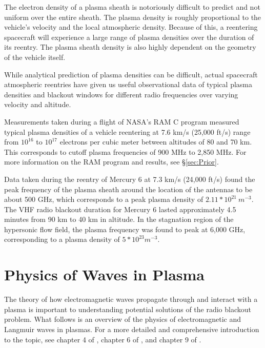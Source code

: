 \documentclass[twocolumn]{article}
\begin{document}
The electron density of a plasma sheath is notoriously difficult to predict and not uniform over the entire sheath.
The plasma density is roughly proportional to the vehicle's velocity and the local atmospheric density.
Because of this, a reentering spacecraft will experience a large range of plasma densities over the duration of its reentry.
The plasma sheath density is also highly dependent on the geometry of the vehicle itself.


While analytical prediction of plasma densities can be difficult, actual spacecraft atmospheric reentries have given us useful observational data of typical plasma densities and blackout windows for different radio frequencies over varying velocity and altitude.

Measurements taken during a flight of NASA's RAM C program measured typical plasma densities of a vehicle reentering at 7.6 km/s (25,000 ft/s) range from $10^{16}$ to $10^{17}$ electrons per cubic meter between altitudes of 80 and 70 km.\cite{akey_radio_1970}
This corresponds to cutoff plasma frequencies of 900 MHz to 2,850 MHz.
For more information on the RAM program and results, see \S\ref{sec:Prior}.

Data taken during the reentry of Mercury 6 at 7.3 km/s (24,000 ft/s) found the peak frequency of the plasma sheath around the location of the antennas to be about 500 GHz, which corresponds to a peak plasma density of $2.11*10^{21} \  m^{-3}$.
The VHF radio blackout duration for Mercury 6 lasted approximately 4.5 minutes from 90 km to 40 km in altitude.
In the stagnation region of the hypersonic flow field, the plasma frequency was found to peak at 6,000 GHz, corresponding to a plasma density of $5*10^{23} m^{-3}$. \cite{lehnert_plasma_1964}


\section{Physics of Waves in Plasma} \label{sec:Waves}
The theory of how electromagnetic waves propagate through and interact with a plasma is important to understanding potential solutions of the radio blackout problem.
What follows is an overview of the physics of electromagnetic and Langmuir waves in plasmas.
For a more detailed and comprehensive introduction to the topic, see chapter 4 of \cite{chen_introduction_1984}, chapter 6 of \cite{papas_theory_1965}, and chapter 9 of \cite{fitzpatrick_maxwells_2008}.
\end{document}

